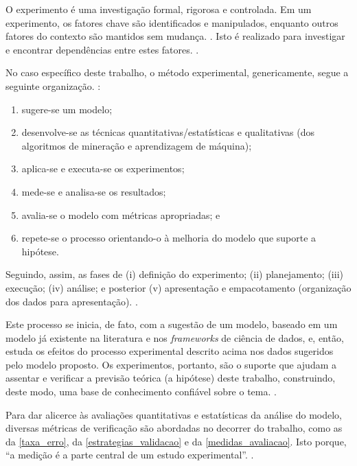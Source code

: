 \documentclass[
	12pt,				%
	openright,			%
	oneside,			%
	a4paper,			%
	english,			%
	french,				%
	spanish,			%
	brazil				%
	]{abntex2}
\begin{document}
O experimento é uma investigação formal, rigorosa e controlada. Em um experimento, os fatores chave são identificados e manipulados, enquanto outros fatores do contexto são mantidos sem mudança. \cite[p. 11]{wohlin_experimentation_2000}. Isto é realizado para investigar e encontrar dependências entre estes fatores. \cite[p. 63]{wazlawick2009} .

No caso específico deste trabalho, o método experimental, genericamente, segue a seguinte organização. \cite[p. 3]{travassos_introducao_2002}:
\begin{enumerate}
	\item sugere-se um modelo; 
	\item desenvolve-se as técnicas quantitativas/estatísticas e qualitativas (dos algoritmos de mineração e aprendizagem de máquina);
	\item aplica-se e executa-se os experimentos;
	\item mede-se e analisa-se os resultados;
	\item avalia-se o modelo com métricas apropriadas; e
	\item repete-se o processo orientando-o à melhoria do modelo que suporte a hipótese.
\end{enumerate}

Seguindo, assim, as fases de (i) definição do experimento; (ii) planejamento; (iii) execução; (iv) análise; e posterior (v) apresentação e empacotamento (organização dos dados para apresentação). \cite[p. 21 e 22]{travassos_introducao_2002}.

Este processo se inicia, de fato, com a sugestão de um modelo, baseado em um modelo já existente na literatura e nos \textit{frameworks} de ciência de dados, e, então, estuda os efeitos do processo experimental descrito acima nos dados sugeridos pelo modelo proposto. Os experimentos, portanto, são o suporte que ajudam a assentar e verificar a previsão teórica (a hipótese) deste trabalho, construindo, deste modo, uma base de conhecimento confiável sobre o tema. \cite[p. 3 e 4]{travassos_introducao_2002}.

Para dar alicerce às avaliações quantitativas e estatísticas da análise do modelo, diversas métricas de verificação são abordadas no decorrer do trabalho, como as da \autoref{taxa_erro}, da \autoref{estrategias_validacao} e da \autoref{medidas_avaliacao}. Isto porque, ``a medição é a parte central de um estudo experimental''. \cite[p. 10]{travassos_introducao_2002}.
\end{document}
